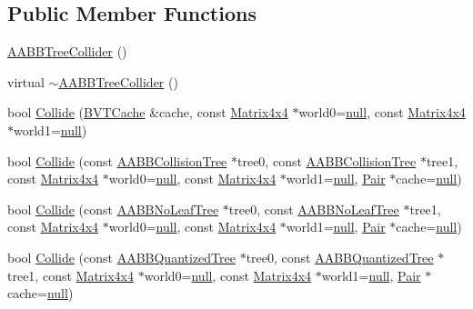 \subsection*{Public Member Functions}
\begin{DoxyCompactItemize}
\item 
\hyperlink{classOpcode_1_1AABBTreeCollider_aa72f368c543cd786858341d2f087565f}{A\+A\+B\+B\+Tree\+Collider} ()
\item 
virtual \hyperlink{classOpcode_1_1AABBTreeCollider_aca1c5cd562bfa332e019727a61c6a8df}{$\sim$\+A\+A\+B\+B\+Tree\+Collider} ()
\item 
bool \hyperlink{classOpcode_1_1AABBTreeCollider_a2e7e3213e9d863cc88c10efc808708ba}{Collide} (\hyperlink{structOpcode_1_1BVTCache}{B\+V\+T\+Cache} \&cache, const \hyperlink{classOpcode_1_1Matrix4x4}{Matrix4x4} $\ast$world0=\hyperlink{IceTypes_8h_ac97b8ee753e4405397a42ad5799b0f9e}{null}, const \hyperlink{classOpcode_1_1Matrix4x4}{Matrix4x4} $\ast$world1=\hyperlink{IceTypes_8h_ac97b8ee753e4405397a42ad5799b0f9e}{null})
\item 
bool \hyperlink{classOpcode_1_1AABBTreeCollider_afd6126e7f6d1e38d77282956bb719170}{Collide} (const \hyperlink{classOpcode_1_1AABBCollisionTree}{A\+A\+B\+B\+Collision\+Tree} $\ast$tree0, const \hyperlink{classOpcode_1_1AABBCollisionTree}{A\+A\+B\+B\+Collision\+Tree} $\ast$tree1, const \hyperlink{classOpcode_1_1Matrix4x4}{Matrix4x4} $\ast$world0=\hyperlink{IceTypes_8h_ac97b8ee753e4405397a42ad5799b0f9e}{null}, const \hyperlink{classOpcode_1_1Matrix4x4}{Matrix4x4} $\ast$world1=\hyperlink{IceTypes_8h_ac97b8ee753e4405397a42ad5799b0f9e}{null}, \hyperlink{structPair}{Pair} $\ast$cache=\hyperlink{IceTypes_8h_ac97b8ee753e4405397a42ad5799b0f9e}{null})
\item 
bool \hyperlink{classOpcode_1_1AABBTreeCollider_ad64c8281e2cefa4fa33d2026b2fb899a}{Collide} (const \hyperlink{classOpcode_1_1AABBNoLeafTree}{A\+A\+B\+B\+No\+Leaf\+Tree} $\ast$tree0, const \hyperlink{classOpcode_1_1AABBNoLeafTree}{A\+A\+B\+B\+No\+Leaf\+Tree} $\ast$tree1, const \hyperlink{classOpcode_1_1Matrix4x4}{Matrix4x4} $\ast$world0=\hyperlink{IceTypes_8h_ac97b8ee753e4405397a42ad5799b0f9e}{null}, const \hyperlink{classOpcode_1_1Matrix4x4}{Matrix4x4} $\ast$world1=\hyperlink{IceTypes_8h_ac97b8ee753e4405397a42ad5799b0f9e}{null}, \hyperlink{structPair}{Pair} $\ast$cache=\hyperlink{IceTypes_8h_ac97b8ee753e4405397a42ad5799b0f9e}{null})
\item 
bool \hyperlink{classOpcode_1_1AABBTreeCollider_a4ad33802d81db3bc504c64b9aebe88f4}{Collide} (const \hyperlink{classOpcode_1_1AABBQuantizedTree}{A\+A\+B\+B\+Quantized\+Tree} $\ast$tree0, const \hyperlink{classOpcode_1_1AABBQuantizedTree}{A\+A\+B\+B\+Quantized\+Tree} $\ast$tree1, const \hyperlink{classOpcode_1_1Matrix4x4}{Matrix4x4} $\ast$world0=\hyperlink{IceTypes_8h_ac97b8ee753e4405397a42ad5799b0f9e}{null}, const \hyperlink{classOpcode_1_1Matrix4x4}{Matrix4x4} $\ast$world1=\hyperlink{IceTypes_8h_ac97b8ee753e4405397a42ad5799b0f9e}{null}, \hyperlink{structPair}{Pair} $\ast$cache=\hyperlink{IceTypes_8h_ac97b8ee753e4405397a42ad5799b0f9e}{null})

\end{DoxyCompactItemize}
